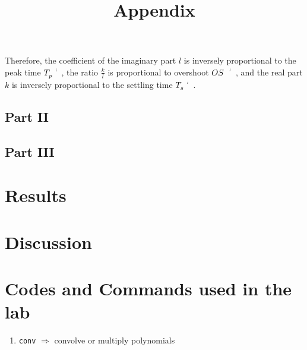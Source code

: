 \documentclass[11pt]{article}
\begin{document}
\begin{adjustwidth}{0.5in}{0in}
        Therefore, the coefficient of the imaginary part \(l\) is inversely proportional to the peak time \(\setprime{T}_p\),
        the ratio \(\frac{k}l\) is proportional to overshoot \(\setprime{OS}\),
        and the real part \(k\) is inversely proportional to the settling time \(\setprime{T}_s\).
    \subsection{Part II}
    \subsection{Part III}
\end{adjustwidth}

\section{Results}
\section{Discussion}

\newpage
\appendix
\title{Appendix}\label{doc:apx}
\maketitle

\section{Codes and Commands used in the lab}

\begin{enumerate}
    \item
        \texttt{conv}
        \tabto{1.5in}
        \(\Rightarrow\) convolve or multiply polynomials
\end{enumerate}
\end{document}
